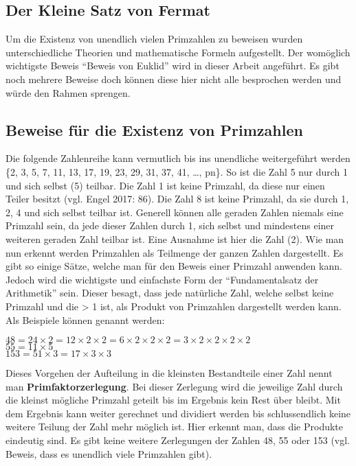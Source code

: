 \documentclass[german,12pt,a4paper]{article}
\begin{document}
\subsection{Der Kleine Satz von Fermat}


Um die Existenz von unendlich vielen Primzahlen zu beweisen wurden unterschiedliche Theorien und mathematische Formeln aufgestellt. Der womöglich wichtigste Beweis “Beweis von Euklid” wird in dieser Arbeit angeführt. Es gibt noch mehrere Beweise doch können diese hier nicht alle besprochen werden und würde den Rahmen sprengen.

\subsection{Beweise für die Existenz von Primzahlen}
Die folgende Zahlenreihe kann vermutlich bis ins unendliche weitergeführt werden \{2, 3, 5, 7, 11, 13, 17, 19, 23, 29, 31, 37, 41, …, pn\}. So ist die Zahl 5 nur durch 1 und sich selbst (5) teilbar. Die Zahl 1 ist keine Primzahl, da diese nur einen Teiler besitzt (vgl. Engel 2017: 86). Die Zahl 8 ist keine Primzahl, da sie durch 1, 2, 4 und sich selbst teilbar ist. Generell können alle geraden Zahlen niemals eine Primzahl sein, da jede dieser Zahlen durch 1, sich selbst und mindestens einer weiteren geraden Zahl teilbar ist. Eine Ausnahme ist hier die Zahl (2). Wie man nun erkennt werden Primzahlen als Teilmenge der ganzen Zahlen dargestellt. Es gibt so einige Sätze, welche man für den Beweis einer Primzahl anwenden kann. Jedoch wird die wichtigste und einfachste Form der “Fundamentalsatz der Arithmetik” sein. Dieser besagt, dass jede natürliche Zahl, welche selbst keine Primzahl und die > 1 ist, als Produkt von Primzahlen dargestellt werden kann. Als Beispiele können genannt werden:\
\begin{center}$48 = 24\times{2} = 12\times{2}\times{2} = 6\times{2}\times{2}\times{2} = 3\times{2}\times{2}\times{2}\times{2}$\\
$55 = 11\times5$\\
$153 = 51\times{3} = 17\times{3}\times{3}$\end{center}
Dieses Vorgehen der Aufteilung in die kleinsten Bestandteile einer Zahl nennt man \textbf{Primfaktorzerlegung}. Bei dieser Zerlegung wird die jeweilige Zahl durch die kleinst mögliche Primzahl geteilt bis im Ergebnis kein Rest über bleibt. Mit dem Ergebnis kann weiter gerechnet und dividiert werden bis schlussendlich keine weitere Teilung der Zahl mehr möglich ist. Hier erkennt man, dass die Produkte eindeutig sind. Es gibt keine weitere Zerlegungen der Zahlen 48, 55 oder 153 (vgl. Beweis, dass es unendlich viele Primzahlen gibt). 
\end{document}
